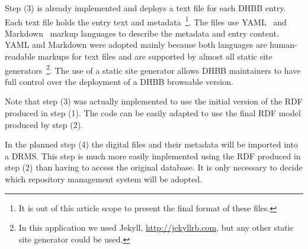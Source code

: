 Step (3) is already implemented and deploys a text file for each DHBB entry. Each text
file holds the entry text and metadata~\footnote{It is out of this article
scope to present the final format of these files.}.
The files use YAML~\cite{yaml} and Markdown~\cite{markdown} markup
languages to describe the metadata and entry content. YAML and Markdown were adopted 
mainly because both languages are human-readable
markups for text files and are supported by almost all static site
generators~\footnote{In this application we used Jekyll,
  \url{http://jekyllrb.com}, but any other static site generator could
  be used.}. The use of a static site generator allows DHBB
maintainers to have full control over the deployment of a DHBB browsable
version.



Note that step (3) was actually implemented to use the initial
version of the RDF produced in step (1). The code can be easily
adapted to use the final RDF model produced by step (2).

In the planned step (4) the digital files and their metadata will be imported into
a DRMS. This step is much more easily implemented using the RDF
produced in step (2) than having to access the original database. It is only necessary
to decide which repository management system will be adopted.



